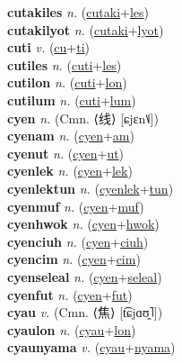 \textbf{cutakiles} \textit{n.} (\hyperref[cutaki]{cutaki}+\hyperref[les]{les})
 \label{cutakiles} \\
\textbf{cutakilyot} \textit{n.} (\hyperref[cutaki]{cutaki}+\hyperref[lyot]{lyot})
 \label{cutakilyot} \\
\textbf{cuti} \textit{v.} (\hyperref[cu]{cu}+\hyperref[ti]{ti})
 \label{cuti} \\
\textbf{cutiles} \textit{n.} (\hyperref[cuti]{cuti}+\hyperref[les]{les})
 \label{cutiles} \\
\textbf{cutilon} \textit{n.} (\hyperref[cuti]{cuti}+\hyperref[lon]{lon})
 \label{cutilon} \\
\textbf{cutilum} \textit{n.} (\hyperref[cuti]{cuti}+\hyperref[lum]{lum})
 \label{cutilum} \\
\textbf{cyen} \textit{n.} (Cmn. ⟨线⟩ [ɕjɛn˥˩])
 \label{cyen} \\
\textbf{cyenam} \textit{n.} (\hyperref[cyen]{cyen}+\hyperref[am]{am})
 \label{cyenam} \\
\textbf{cyenut} \textit{n.} (\hyperref[cyen]{cyen}+\hyperref[ut]{ut})
 \label{cyenut} \\
\textbf{cyenlek} \textit{n.} (\hyperref[cyen]{cyen}+\hyperref[lek]{lek})
 \label{cyenlek} \\
\textbf{cyenlektun} \textit{n.} (\hyperref[cyenlek]{cyenlek}+\hyperref[tun]{tun})
 \label{cyenlektun} \\
\textbf{cyenmuf} \textit{n.} (\hyperref[cyen]{cyen}+\hyperref[muf]{muf})
 \label{cyenmuf} \\
\textbf{cyenhwok} \textit{n.} (\hyperref[cyen]{cyen}+\hyperref[hwok]{hwok})
 \label{cyenhwok} \\
\textbf{cyenciuh} \textit{n.} (\hyperref[cyen]{cyen}+\hyperref[ciuh]{ciuh})
 \label{cyenciuh} \\
\textbf{cyencim} \textit{n.} (\hyperref[cyen]{cyen}+\hyperref[cim]{cim})
 \label{cyencim} \\
\textbf{cyenseleal} \textit{n.} (\hyperref[cyen]{cyen}+\hyperref[seleal]{seleal})
 \label{cyenseleal} \\
\textbf{cyenfut} \textit{n.} (\hyperref[cyen]{cyen}+\hyperref[fut]{fut})
 \label{cyenfut} \\
\textbf{cyau} \textit{v.} (Cmn. ⟨焦⟩ [t͡ɕjɑʊ̯˥])
 \label{cyau} \\
\textbf{cyaulon} \textit{n.} (\hyperref[cyau]{cyau}+\hyperref[lon]{lon})
 \label{cyaulon} \\
\textbf{cyaunyama} \textit{v.} (\hyperref[cyau]{cyau}+\hyperref[nyama]{nyama})
 \label{cyaunyama} \\
